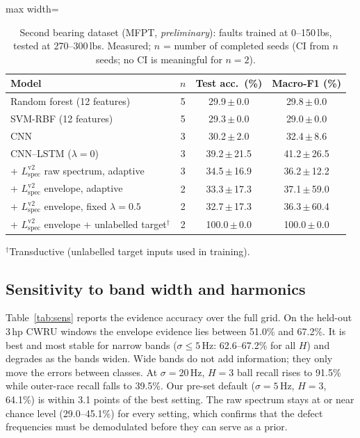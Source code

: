 \documentclass[conference]{IEEEtran}
\begin{document}
\begin{table}[t]
\caption{Second bearing dataset (MFPT, \emph{preliminary}): faults trained at 0--150\,lbs, tested at 270--300\,lbs. Measured; $n$ = number of completed seeds (CI from $n$ seeds; no CI is meaningful for $n=2$).}
\label{tab:mfpt}
\centering
\footnotesize
\begin{adjustbox}{max width=\columnwidth}
\begin{tabular}{lccc}
\toprule
Model & $n$ & Test acc.\ (\%) & Macro-F1 (\%) \\
\midrule
Random forest (12 features) & 5 & 29.9\,$\pm$\,0.0 & 29.8\,$\pm$\,0.0 \\
SVM-RBF (12 features) & 5 & 29.3\,$\pm$\,0.0 & 29.0\,$\pm$\,0.0 \\
CNN & 3 & 30.2\,$\pm$\,2.0 & 32.4\,$\pm$\,8.6 \\
CNN--LSTM ($\lambda=0$) & 3 & 39.2\,$\pm$\,21.5 & 41.2\,$\pm$\,26.5 \\
\midrule
+ $L_{\mathrm{spec}}^{\mathrm{v2}}$ raw spectrum, adaptive & 3 & 34.5\,$\pm$\,16.9 & 36.2\,$\pm$\,12.2 \\
+ $L_{\mathrm{spec}}^{\mathrm{v2}}$ envelope, adaptive & 2 & 33.3\,$\pm$\,17.3 & 37.1\,$\pm$\,59.0 \\
+ $L_{\mathrm{spec}}^{\mathrm{v2}}$ envelope, fixed $\lambda=0.5$ & 2 & 32.7\,$\pm$\,17.3 & 36.3\,$\pm$\,60.4 \\
+ $L_{\mathrm{spec}}^{\mathrm{v2}}$ envelope + unlabelled target$^{\dagger}$ & 2 & 100.0\,$\pm$\,0.0 & 100.0\,$\pm$\,0.0 \\
\bottomrule
\end{tabular}
\end{adjustbox}
\par\vspace{2pt}\parbox{\columnwidth}{\scriptsize $^{\dagger}$Transductive (unlabelled target inputs used in training).}
\end{table}


\subsection{Sensitivity to band width and harmonics}
Table~\ref{tab:sens} reports the evidence accuracy over the full grid. On the
held-out 3\,hp CWRU windows the envelope evidence lies between 51.0\% and
67.2\%. It is best and most stable for narrow bands ($\sigma\le5$\,Hz: 62.6--67.2\%
for all $H$) and degrades as the bands widen. Wide bands do not add
information; they only move the errors between classes. At $\sigma=20$\,Hz,
$H=3$ ball recall rises to 91.5\% while outer-race recall falls to 39.5\%.
Our pre-set default ($\sigma=5$\,Hz, $H=3$, 64.1\%) is within 3.1 points of the
best setting. The raw spectrum stays at or near chance level (29.0--45.1\%) for
every setting, which confirms that the defect frequencies must be demodulated
before they can serve as a prior.
\end{document}
